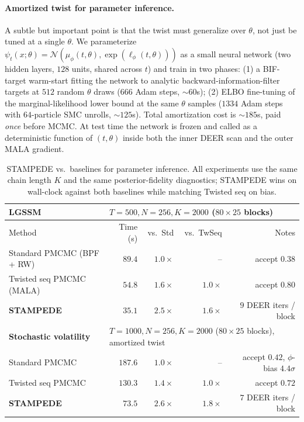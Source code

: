 \documentclass{article}
\begin{document}
\paragraph{Amortized twist for parameter inference.} A subtle but important point is that the twist must generalize over $\theta$, not just be tuned at a single $\theta$. We parameterize $\psi_t(x; \theta) = \mathcal{N}(\mu_\phi(t, \theta), \exp(\ell_\phi(t, \theta)))$ as a small neural network (two hidden layers, $128$ units, shared across $t$) and train in two phases: (1) a BIF-target warm-start fitting the network to analytic backward-information-filter targets at $512$ random $\theta$ draws ($666$ Adam steps, $\sim 60$s); (2) ELBO fine-tuning of the marginal-likelihood lower bound at the same $\theta$ samples ($1334$ Adam steps with $64$-particle SMC unrolls, $\sim 125$s). Total amortization cost is $\sim 185$s, paid \emph{once} before MCMC. At test time the network is frozen and called as a deterministic function of $(t, \theta)$ inside both the inner DEER scan and the outer MALA gradient.

\begin{table}[t]
\caption{STAMPEDE vs.\ baselines for parameter inference. All experiments use the same chain length $K$ and the same posterior-fidelity diagnostics; STAMPEDE wins on wall-clock against both baselines while matching Twisted seq on bias.}
\label{tab:stampede-mcmc}
\centering
\small
\begin{tabular}{lrrrr}
\toprule
\multicolumn{1}{l}{\textbf{LGSSM}} & \multicolumn{4}{l}{$T=500, N=256, K=2000$ ($80 \times 25$ blocks)} \\
\midrule
Method & Time (s) & vs.\ Std & vs.\ TwSeq & Notes \\
\midrule
Standard PMCMC (BPF + RW)        & $89.4$ & $1.0\times$ & --          & accept $0.38$ \\
Twisted seq PMCMC (MALA)         & $54.8$ & $1.6\times$ & $1.0\times$ & accept $0.80$ \\
\textbf{STAMPEDE}                & $\mathbf{35.1}$ & $\mathbf{2.5\times}$ & $\mathbf{1.6\times}$ & $9$ DEER iters / block \\
\midrule
\multicolumn{1}{l}{\textbf{Stochastic volatility}} & \multicolumn{4}{l}{$T=1000, N=256, K=2000$ ($80 \times 25$ blocks), amortized twist} \\
\midrule
Standard PMCMC                   & $187.6$  & $1.0\times$ & --          & accept $0.42$, $\phi$-bias $4.4\sigma$ \\
Twisted seq PMCMC                & $130.3$  & $1.4\times$ & $1.0\times$ & accept $0.72$ \\
\textbf{STAMPEDE}                & $\mathbf{73.5}$ & $\mathbf{2.6\times}$ & $\mathbf{1.8\times}$ & $7$ DEER iters / block \\
\bottomrule
\end{tabular}
\end{table}
\end{document}
